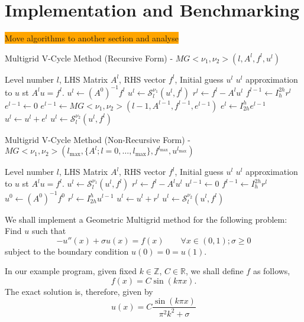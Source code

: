 \documentclass[a4paper,10pt,oneside]{book}
\theoremstyle{plain}%
\theoremstyle{definition}
\theoremstyle{remark}
\newcommand{\bbR}{\mathbb{R}}
\newcommand{\bbZ}{\mathbb{Z}}
\newcommand{\calS}{\mathcal{S}}
\begin{document}
\chapter{Implementation and Benchmarking}
\colorbox{orange}{Move algorithms to another section and analyse}
\begin{algorithm}
 \caption{Multigrid V-Cycle Method (Recursive Form) -
$MG<\nu_1,\nu_2>(l,A^l,f^l,u^l)$}
 \begin{algorithmic}
  \REQUIRE Level number $l$, LHS Matrix $A^l$, RHS vector
$f^l$, Initial guess $u^l$
  \ENSURE $u^l$ approximation to $u$ st $A^lu=f^l$.
   \STATE $u^l \gets (A^0)^{-1}f^l$
  \ELSE
   \STATE $u^l \gets \calS_l^{\nu_1}(u^l, f^l)$ 
   \STATE $r^l \gets f^l-A^lu^l$
   \STATE $f^{l-1} \gets I_h^{2h}r^l$
   \STATE $e^{l-1} \gets 0$
   \STATE $e^{l-1} \gets MG<\nu_1,\nu_2>(l-1,A^{l-1},f^{l-1},e^{l-1})$
   \STATE $e^l \gets I_{2h}^he^{l-1}$
   \STATE $u^l \gets u^l + e^l$           
   \STATE $u^l \gets \calS_l^{\nu_2}(u^l , f^l)$ 
  \ENDIF
 \end{algorithmic}
\end{algorithm}
\begin{algorithm}
 \caption{Multigrid V-Cycle Method (Non-Recursive Form) -
$MG<\nu_1,\nu_2>(l_{\max},\{A^l;l=0,\dots,l_{\max}\}, f^{l_{\max}},
u^{l_{\max}})$}
 \begin{algorithmic}
  \REQUIRE Level number $l$, LHS Matrix $A^l$, RHS vector
$f^l$, Initial guess $u^l$
  \ENSURE $u^l$ approximation to $u$ st $A^lu=f^l$.
   \STATE $u^l \gets \calS_l^{\nu_1}(u^l, f^l)$ 
   \STATE $r^l \gets f^l-A^lu^l$
   \STATE $u^{l-1} \gets 0$
   \STATE $f^{l-1} \gets I_h^{2h}r^l$
  \ENDFOR
  \STATE $u^0\gets (A^0)^{-1}f^0$
   \STATE $r^l \gets I_{2h}^hu^{l-1}$
   \STATE $u^l \gets u^l + r^l$           
   \STATE $u^l \gets \calS_l^{\nu_2}(u^l , f^l)$ 
  \ENDFOR
 \end{algorithmic}
\end{algorithm}
We shall implement a Geometric Multigrid method for the following problem: Find
$u$ such that
\begin{equation}
 -u''(x)+\sigma u(x) = f(x)\qquad\forall x\in(0,1);\sigma\geq0
\end{equation}
subject to the boundary condition $u(0)=0=u(1)$.

In our example program, given fixed $k\in\bbZ$, $C\in\bbR$, we shall define $f$
as follows,
\begin{equation}
 f(x) = C\sin(k\pi x).
\end{equation}
The exact solution is, therefore, given by
\begin{equation}
 u(x) = C\frac{\sin(k\pi x)}{\pi^2k^2+\sigma}
\end{equation}
\end{document}
